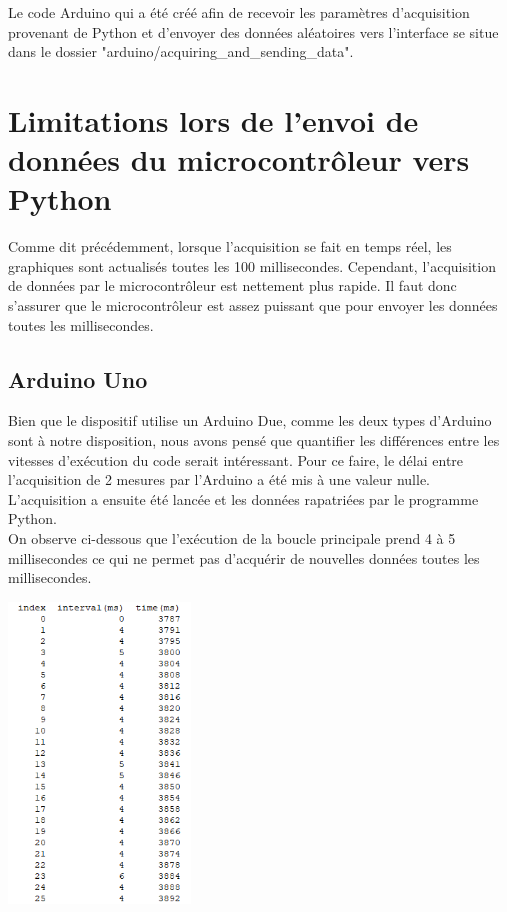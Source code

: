 Le code Arduino qui a été créé afin de recevoir les paramètres d'acquisition provenant de Python et d'envoyer des données aléatoires vers l'interface se situe dans le dossier "arduino/acquiring\_and\_sending\_data".

\newpage
\section{Limitations lors de l'envoi de données du microcontrôleur vers Python}

Comme dit précédemment, lorsque l'acquisition se fait en temps réel, les graphiques sont actualisés toutes les 100 millisecondes. Cependant, l'acquisition de données par le microcontrôleur est nettement plus rapide. Il faut donc s'assurer que le microcontrôleur est assez puissant que pour envoyer les données toutes les millisecondes.

\subsection{Arduino Uno}

Bien que le dispositif utilise un Arduino Due, comme les deux types d'Arduino sont à notre disposition, nous avons pensé que quantifier les différences entre les vitesses d'exécution du code serait intéressant. Pour ce faire, le délai entre l'acquisition de 2 mesures par l'Arduino a été mis à une valeur nulle. L'acquisition a ensuite été lancée et les données rapatriées par le programme Python.\\

On observe ci-dessous que l'exécution de la boucle principale prend 4 à 5 millisecondes ce qui ne permet pas d'acquérir de nouvelles données toutes les millisecondes. 

\begin{center}
    \includegraphics[height=8cm]{images/arduino_uno.png}
\end{center}

